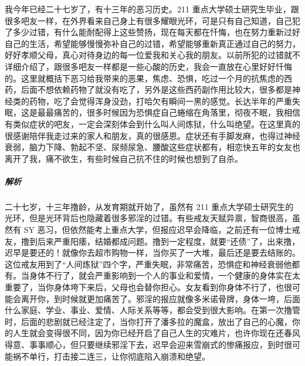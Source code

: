 \begin{case}[神经衰弱]
    我今年已经二十七岁了，有十三年的恶习历史。211 重点大学硕士研究生毕业，跟很多吧友一样，在外界看来自己身上有很多耀眼光环，可是只有自己知道，自己犯了多少过错，有什么能耐配得上这些赞扬，现在每天都在忏悔，也在努力重新过好自己的生活，希望能够慢慢弥补自己的过错，希望能够重新真正通过自己的努力，好好孝顺父母，真心对待身边的每一位爱我和关心我的朋友。以前所犯的过错就不详细介绍了，跟很多吧友一样都是一些心酸的历史，我会一直放在心里好好忏悔的。这里就概括下恶习给我带来的恶果，焦虑、恐惧，吃过一个月的抗焦虑的西药，后面不想依赖药物了就没有吃了，另外是这些西药副作用比较大，很多都是神经类的药物，吃了会觉得浑身没劲，打哈欠有瞬间一黑的感觉。长达半年的严重失眠，这是最最痛苦的，很多时候因为恐惧症自己蜷缩在角落里，彻夜不眠，我相信有类似症状的吧友，一定会深刻体会到什么叫人间炼狱，什么叫绝望。在这里真的很感谢陪伴我走过来的家人和朋友，真的很感恩。症状还有手脚发麻，也得过神经衰弱，脑力下降、勃起不坚、尿频尿急、腰酸这些症状都有，相恋快五年的女友也离开了我，痛不欲生，有些时候自己抗不住的时候也想到了自杀。
    \subparagraph{解析} 二十七岁，十三年撸龄，从发育期就开始了，虽然有 211 重点大学硕士研究生的光环，但是光环背后也隐藏着很多邪淫的过错。有些戒友天赋异禀，智商很高，虽然有 SY 恶习，但依然能考上重点大学，但报应迟早会降临，之前还有一位博士戒友，撸到后来严重阳痿，结婚都成问题。撸到一定程度，就要“还债”了，出来撸，迟早是要还的！就像你去超市购物一样，当你买了一大堆，最后还是要去结账的。这位戒友用到了“人间炼狱”四个字，严重失眠，非常痛苦，恐惧症和神经衰弱他都有。当身体不行了，就会严重影响到一个人的事业和爱情，一个健康的身体实在太重要了，当你身体垮下来后，父母也会替你担心。女友看到你身体不行了，也很可能会离开你，到时候就更加痛苦了。邪淫的报应就像多米诺骨牌，身体一垮，后面什么家庭、学业、事业、爱情、人际关系等等，都会受到很大影响。在第一次撸管时，后面的悲剧就已经注定了，当你打开了潘多拉的魔盒，放出了自己的心魔，你的人生就会变得很不同，因为你已经开启了自己人生的灾难片，也许你现在还春风得意、事事顺心，但只要继续邪淫下去，迟早会迎来雪崩式的惨痛报应，到时很可能祸不单行，打击接二连三，让你彻底陷入崩溃和绝望。
\end{case}

